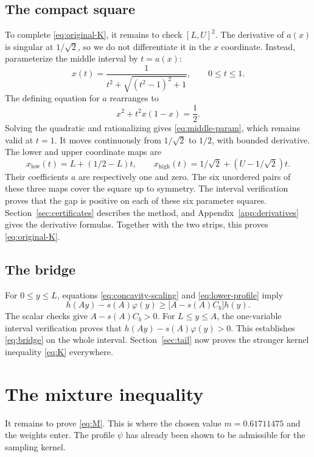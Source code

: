 \documentclass[11pt]{article}
\theoremstyle{remark}
\begin{document}
\subsection{The compact square}
To complete \eqref{eq:original-K}, it remains to check \([L,U]^2\).
The derivative of \(a(x)\) is singular at \(1/\sqrt2\), so we do
not differentiate it in the \(x\) coordinate. Instead, parameterize
the middle interval by \(t=a(x)\):
\begin{equation}\label{eq:middle-param}
x(t)=\frac1{t^2+\sqrt{(t^2-1)^2+1}},\qquad0\le t\le1.
\end{equation}
The defining equation for \(a\) rearranges to
\[
x^2+t^2x(1-x)=\frac12.
\]
Solving the quadratic and rationalizing gives
\eqref{eq:middle-param}, which remains valid at \(t=1\).
It moves continuously from \(1/\sqrt2\) to \(1/2\), with bounded
derivative. The lower and upper coordinate maps are
\[
x_{\mathrm{low}}(t)=L+(1/2-L)t,\qquad
x_{\mathrm{high}}(t)=1/\sqrt2+(U-1/\sqrt2)t.
\]
Their coefficients \(a\) are respectively one and zero.
The six unordered pairs of these three maps cover the square up
to symmetry. The interval verification proves that the gap is positive on
each of these six parameter squares.
Section~\ref{sec:certificates} describes the method, and
Appendix~\ref{app:derivatives} gives the derivative formulas.
Together with the two strips, this proves \eqref{eq:original-K}.

\subsection{The bridge}\label{sec:bridge}
For \(0\le y\le L\), equations \eqref{eq:concavity-scaling} and
\eqref{eq:lower-profile} imply
\[
h(Ay)-s(A)\varphi(y)\ge\bigl[A-s(A)C_b\bigr]h(y).
\]
The scalar checks give \(A-s(A)C_b>0\).
For \(L\le y\le A\), the one-variable interval verification proves
that \(h(Ay)-s(A)\varphi(y)>0\). This establishes
\eqref{eq:bridge} on the whole interval.
Section~\ref{sec:tail} now proves the stronger kernel
inequality \eqref{eq:K} everywhere.

\section{The mixture inequality}\label{sec:mixture}

It remains to prove \eqref{eq:M}.
This is where the chosen value \(m=0.61711475\) and the weights enter.
The profile \(\psi\) has already been shown to be admissible for
the sampling kernel.
\end{document}
